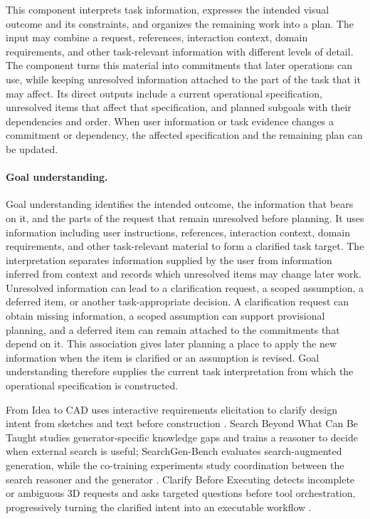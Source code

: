 This component interprets task information, expresses the intended visual outcome and its constraints, and organizes the remaining work into a plan. The input may combine a request, references, interaction context, domain requirements, and other task-relevant information with different levels of detail. The component turns this material into commitments that later operations can use, while keeping unresolved information attached to the part of the task that it may affect. Its direct outputs include a current operational specification, unresolved items that affect that specification, and planned subgoals with their dependencies and order. When user information or task evidence changes a commitment or dependency, the affected specification and the remaining plan can be updated.

\paragraph{Goal understanding.}
Goal understanding identifies the intended outcome, the information that bears on it, and the parts of the request that remain unresolved before planning. It uses information including user instructions, references, interaction context, domain requirements, and other task-relevant material to form a clarified task target. The interpretation separates information supplied by the user from information inferred from context and records which unresolved items may change later work. Unresolved information can lead to a clarification request, a scoped assumption, a deferred item, or another task-appropriate decision. A clarification request can obtain missing information, a scoped assumption can support provisional planning, and a deferred item can remain attached to the commitments that depend on it. This association gives later planning a place to apply the new information when the item is clarified or an assumption is revised. Goal understanding therefore supplies the current task interpretation from which the operational specification is constructed.

From Idea to CAD uses interactive requirements elicitation to clarify design intent from sketches and text before construction \cite{ocker2025ideatocad}. Search Beyond What Can Be Taught studies generator-specific knowledge gaps and trains a reasoner to decide when external search is useful; SearchGen-Bench evaluates search-augmented generation, while the co-training experiments study coordination between the search reasoner and the generator \cite{wang2026searchgen}. Clarify Before Executing detects incomplete or ambiguous 3D requests and asks targeted questions before tool orchestration, progressively turning the clarified intent into an executable workflow \cite{avg260716352}.

